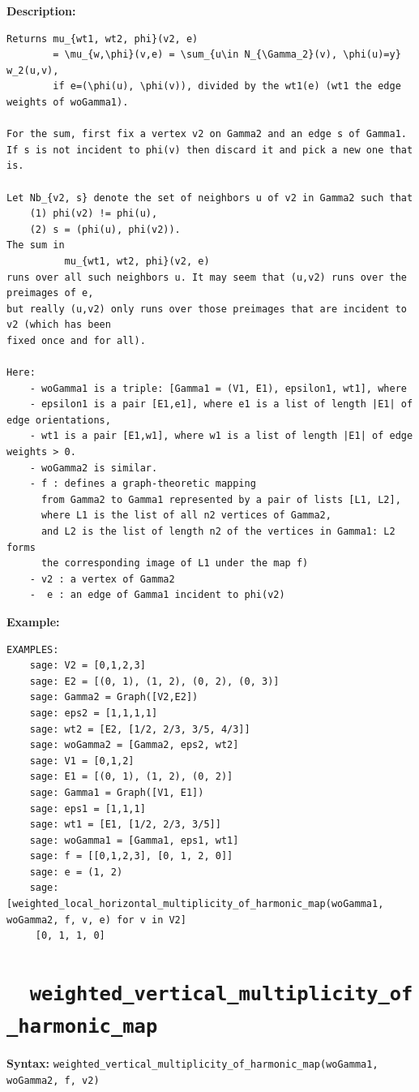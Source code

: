 \documentclass{article}
\begin{document}
\textbf{Description:}
\begin{verbatim}
Returns mu_{wt1, wt2, phi}(v2, e)
        = \mu_{w,\phi}(v,e) = \sum_{u\in N_{\Gamma_2}(v), \phi(u)=y} w_2(u,v),
        if e=(\phi(u), \phi(v)), divided by the wt1(e) (wt1 the edge weights of woGamma1).

For the sum, first fix a vertex v2 on Gamma2 and an edge s of Gamma1. 
If s is not incident to phi(v) then discard it and pick a new one that is.
    
Let Nb_{v2, s} denote the set of neighbors u of v2 in Gamma2 such that
    (1) phi(v2) != phi(u), 
    (2) s = (phi(u), phi(v2)).
The sum in  
          mu_{wt1, wt2, phi}(v2, e) 
runs over all such neighbors u. It may seem that (u,v2) runs over the preimages of e, 
but really (u,v2) only runs over those preimages that are incident to v2 (which has been 
fixed once and for all).

Here:
    - woGamma1 is a triple: [Gamma1 = (V1, E1), epsilon1, wt1], where 
    - epsilon1 is a pair [E1,e1], where e1 is a list of length |E1| of edge orientations,
    - wt1 is a pair [E1,w1], where w1 is a list of length |E1| of edge weights > 0.
    - woGamma2 is similar.
    - f : defines a graph-theoretic mapping
      from Gamma2 to Gamma1 represented by a pair of lists [L1, L2],
      where L1 is the list of all n2 vertices of Gamma2,
      and L2 is the list of length n2 of the vertices in Gamma1: L2 forms 
      the corresponding image of L1 under the map f)
    - v2 : a vertex of Gamma2
    -  e : an edge of Gamma1 incident to phi(v2)
\end{verbatim}

\noindent
\textbf{Example:}
{\small{
\begin{verbatim}
EXAMPLES:
    sage: V2 = [0,1,2,3]
    sage: E2 = [(0, 1), (1, 2), (0, 2), (0, 3)]
    sage: Gamma2 = Graph([V2,E2])
    sage: eps2 = [1,1,1,1]
    sage: wt2 = [E2, [1/2, 2/3, 3/5, 4/3]]
    sage: woGamma2 = [Gamma2, eps2, wt2]
    sage: V1 = [0,1,2]
    sage: E1 = [(0, 1), (1, 2), (0, 2)]
    sage: Gamma1 = Graph([V1, E1])
    sage: eps1 = [1,1,1]
    sage: wt1 = [E1, [1/2, 2/3, 3/5]]
    sage: woGamma1 = [Gamma1, eps1, wt1]
    sage: f = [[0,1,2,3], [0, 1, 2, 0]]
    sage: e = (1, 2)
    sage: [weighted_local_horizontal_multiplicity_of_harmonic_map(woGamma1, woGamma2, f, v, e) for v in V2]
     [0, 1, 1, 0]
\end{verbatim}
}}

\section{\tt \ \ weighted\_vertical\_multiplicity\_of\_harmonic\_map}
\textbf{Syntax:}
\verb}weighted_vertical_multiplicity_of_harmonic_map(woGamma1, woGamma2, f, v2)}\\
\end{document}
